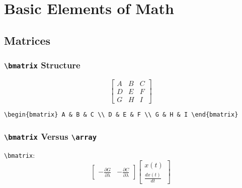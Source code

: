 \section{Basic Elements of Math}
%
\subsection{Matrices}
%
\subsubsection{\texttt{\large \textbackslash bmatrix} Structure}
$$
\begin{bmatrix} A & B & C \\ D & E & F \\ G & H & I \end{bmatrix}
$$
%
\begin{center}
\verb!\begin{bmatrix} A & B & C \\ D & E & F \\ G & H & I \end{bmatrix}!
\end{center}
%
\subsubsection{\texttt{\large \textbackslash bmatrix} Versus \texttt{\large \textbackslash array}}
\texttt{\large \textbackslash bmatrix}:
\begin{equation*} 
\begin{bmatrix}
	-\frac{\partial G}{\partial \lambda} & %
	-\frac{\partial C}{\partial \lambda}
\end{bmatrix}
\begin{bmatrix}	
	x(t) \\
	\frac{dx(t)}{dt} 
\end{bmatrix}
\end{equation*}

